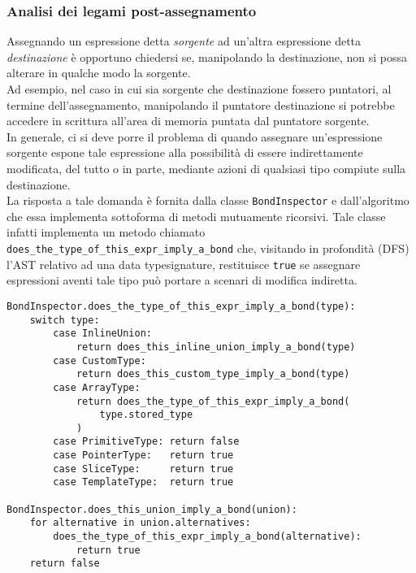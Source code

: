 \subsubsection{Analisi dei legami post-assegnamento}
Assegnando un espressione detta \textit{sorgente} ad un'altra espressione detta \textit{destinazione}
è opportuno chiedersi se, manipolando la destinazione, non si possa alterare in qualche modo la sorgente. \\

Ad esempio, nel caso in cui sia sorgente che destinazione fossero puntatori, al termine dell'assegnamento, 
manipolando il puntatore destinazione si potrebbe accedere in scrittura all'area di memoria puntata 
dal puntatore sorgente. \\

In generale, ci si deve porre il problema di quando assegnare un'espressione sorgente espone 
tale espressione alla possibilità di essere indirettamente modificata, del tutto o in parte, 
mediante azioni di qualsiasi tipo compiute sulla destinazione. \\

La risposta a tale domanda è fornita dalla classe \texttt{BondInspector} e dall'algoritmo che 
essa implementa sottoforma di metodi mutuamente ricorsivi. Tale classe infatti implementa un 
metodo chiamato \texttt{does\_the\_type\_of\_this\_expr\_imply\_a\_bond} che, visitando 
in profondità (DFS) l'AST relativo ad una data typesignature, restituisce \texttt{true} se 
assegnare espressioni aventi tale tipo può portare a scenari di modifica indiretta. \\

\vspace{0.5cm}
\begin{lstlisting}[frame=single]
BondInspector.does_the_type_of_this_expr_imply_a_bond(type):
    switch type:
        case InlineUnion:   
            return does_this_inline_union_imply_a_bond(type)
        case CustomType:    
            return does_this_custom_type_imply_a_bond(type)
        case ArrayType:     
            return does_the_type_of_this_expr_imply_a_bond(
                type.stored_type
            )
        case PrimitiveType: return false
        case PointerType:   return true
        case SliceType:     return true
        case TemplateType:  return true
    
BondInspector.does_this_union_imply_a_bond(union):
    for alternative in union.alternatives:
        does_the_type_of_this_expr_imply_a_bond(alternative):
            return true
    return false
\end{lstlisting}
\vspace{0.5cm}

\newpage
